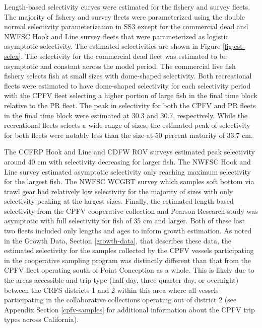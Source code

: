 \documentclass[11pt,
  english,
  letterpaper,
]{article}
\begin{document}
Length-based selectivity curves were estimated for the fishery and survey fleets. The majority of fishery and survey fleets were parameterized using the double normal selectivity parameterization in SS3 except for the commercial dead and NWFSC Hook and Line survey fleets that were parameterized as logistic asymptotic selectivity. The estimated selectivities are shown in Figure \ref{fig:est-selex}. The selectivity for the commercial dead fleet was estimated to be asymptotic and constant across the model period. The commercial live fish fishery selects fish at small sizes with dome-shaped selectivity. Both recreational fleets were estimated to have dome-shaped selectivity for each selectivity period with the CPFV fleet selecting a higher portion of large fish in the final time block relative to the PR fleet. The peak in selectivity for both the CPFV and PR fleets in the final time block were estimated at 30.3 and 30.7, respectively. While the recreational fleets selects a wide range of sizes, the estimated peak of selectivity for both fleets were notably less than the size-at-50 percent maturity of 33.7 cm.

The CCFRP Hook and Line and CDFW ROV surveys estimated peak selectivity around 40 cm with selectivity decreasing for larger fish. The NWFSC Hook and Line survey estimated asymptotic selectivity only reaching maximum selectivity for the largest fish. The NWFSC WCGBT survey which samples soft bottom via trawl gear had relatively low selectivity for the majority of sizes with only selectivity peaking at the largest sizes. Finally, the estimated length-based selectivity from the CPFV cooperative collection and Pearson Research study was asymptotic with full selectivity for fish of 35 cm and larger. Both of these last two fleets included only lengths and ages to inform growth estimation. As noted in the Growth Data, Section \ref{growth-data}, that describes these data, the estimated selectivity for the samples collected by the CPFV vessels participating in the cooperative sampling program was distinctly different than that from the CPFV fleet operating south of Point Conception as a whole. This is likely due to the areas accessible and trip type (half-day, three-quarter day, or overnight) between the CRFS districts 1 and 2 within this area where all vessels participating in the collaborative collections operating out of district 2 (see Appendix Section \ref{cpfv-samples} for additional information about the CPFV trip types across California).
\end{document}

